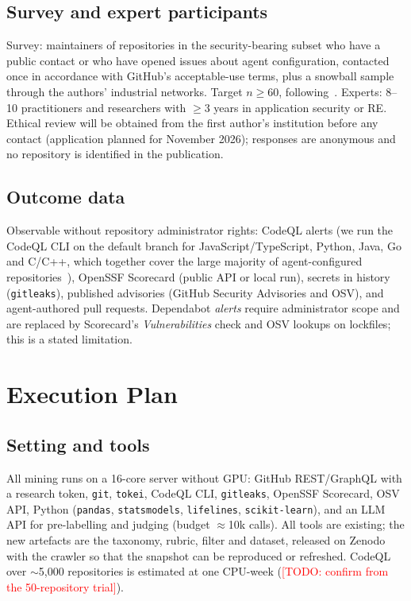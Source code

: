 \documentclass[10pt,conference]{IEEEtran}
\newcommand{\todo}[1]{\textcolor{red}{[TODO: #1]}}
\begin{document}
\subsection{Survey and expert participants}
Survey: maintainers of repositories in the security-bearing subset who have a public contact or who have opened issues about agent configuration, contacted once in accordance with GitHub's acceptable-use terms, plus a snowball sample through the authors' industrial networks. Target $n\geq60$, following~\cite{lu2026modelcard}. Experts: 8--10 practitioners and researchers with $\geq3$ years in application security or RE. Ethical review will be obtained from the first author's institution before any contact (application planned for November 2026); responses are anonymous and no repository is identified in the publication.

\subsection{Outcome data}
Observable without repository administrator rights: CodeQL alerts (we run the CodeQL CLI on the default branch for JavaScript/TypeScript, Python, Java, Go and C/C++, which together cover the large majority of agent-configured repositories~\cite{galster2026configuring}), OpenSSF Scorecard (public API or local run), secrets in history (\texttt{gitleaks}), published advisories (GitHub Security Advisories and OSV), and agent-authored pull requests. Dependabot \emph{alerts} require administrator scope and are replaced by Scorecard's \emph{Vulnerabilities} check and OSV lookups on lockfiles; this is a stated limitation.

\section{Execution Plan}

\subsection{Setting and tools}
All mining runs on a 16-core server without GPU: GitHub REST/GraphQL with a research token, \texttt{git}, \texttt{tokei}, CodeQL CLI, \texttt{gitleaks}, OpenSSF Scorecard, OSV API, Python (\texttt{pandas}, \texttt{statsmodels}, \texttt{lifelines}, \texttt{scikit-learn}), and an LLM API for pre-labelling and judging (budget $\approx$10k calls). All tools are existing; the new artefacts are the taxonomy, rubric, filter and dataset, released on Zenodo with the crawler so that the snapshot can be reproduced or refreshed. CodeQL over $\sim$5,000 repositories is estimated at one CPU-week (\todo{confirm from the 50-repository trial}).
\end{document}
